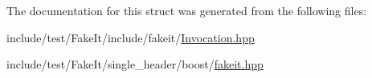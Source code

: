 The documentation for this struct was generated from the following files\+:\begin{DoxyCompactItemize}
\item 
include/test/\+Fake\+It/include/fakeit/\mbox{\hyperlink{Invocation_8hpp}{Invocation.\+hpp}}\item 
include/test/\+Fake\+It/single\+\_\+header/boost/\mbox{\hyperlink{single__header_2boost_2fakeit_8hpp}{fakeit.\+hpp}}\end{DoxyCompactItemize}
